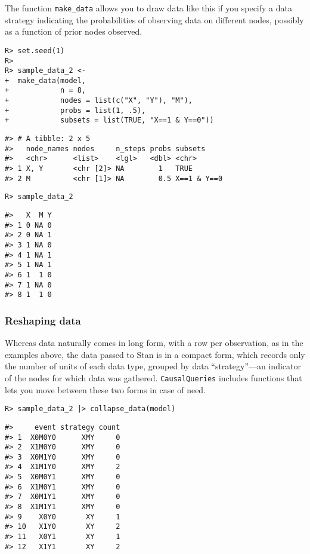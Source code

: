 \documentclass[
  11pt,
  article]{jss}
\begin{document}
The function \texttt{make\_data} allows you to draw data like this if
you specify a data strategy indicating the probabilities of observing
data on different nodes, possibly as a function of prior nodes observed.

\begin{verbatim}
R> set.seed(1)
R> 
R> sample_data_2 <-
+  make_data(model,
+            n = 8,
+            nodes = list(c("X", "Y"), "M"),
+            probs = list(1, .5),
+            subsets = list(TRUE, "X==1 & Y==0"))
\end{verbatim}

\begin{verbatim}
#> # A tibble: 2 x 5
#>   node_names nodes     n_steps probs subsets    
#>   <chr>      <list>    <lgl>   <dbl> <chr>      
#> 1 X, Y       <chr [2]> NA        1   TRUE       
#> 2 M          <chr [1]> NA        0.5 X==1 & Y==0
\end{verbatim}

\begin{verbatim}
R> sample_data_2
\end{verbatim}

\begin{verbatim}
#>   X  M Y
#> 1 0 NA 0
#> 2 0 NA 1
#> 3 1 NA 0
#> 4 1 NA 1
#> 5 1 NA 1
#> 6 1  1 0
#> 7 1 NA 0
#> 8 1  1 0
\end{verbatim}

\hypertarget{reshaping-data}{%
\subsubsection{Reshaping data}\label{reshaping-data}}

Whereas data naturally comes in long form, with a row per observation,
as in the examples above, the data passed to Stan is in a compact form,
which records only the number of units of each data type, grouped by
data ``strategy''---an indicator of the nodes for which data was
gathered. \texttt{CausalQueries} includes functions that lets you move
between these two forms in case of need.

\begin{verbatim}
R> sample_data_2 |> collapse_data(model)
\end{verbatim}

\begin{verbatim}
#>     event strategy count
#> 1  X0M0Y0      XMY     0
#> 2  X1M0Y0      XMY     0
#> 3  X0M1Y0      XMY     0
#> 4  X1M1Y0      XMY     2
#> 5  X0M0Y1      XMY     0
#> 6  X1M0Y1      XMY     0
#> 7  X0M1Y1      XMY     0
#> 8  X1M1Y1      XMY     0
#> 9    X0Y0       XY     1
#> 10   X1Y0       XY     2
#> 11   X0Y1       XY     1
#> 12   X1Y1       XY     2
\end{verbatim}
\end{document}
